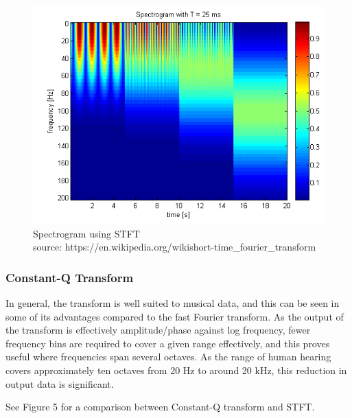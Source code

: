 \begin{figure}[h]
	\caption[Spectrogram using Short-Term Fourier Transform]{ Spectrogram using STFT \\
	source: https://en.wikipedia.org/wiki\/short-time\_fourier\_transform }
	\centering
	\includegraphics[width=1\textwidth, height=\textheight, keepaspectratio]{"resources/STFT_spectrogram"}
\end{figure}


\subsubsection{Constant-Q Transform}
In general, the transform is well suited to musical data, and this can be seen in some of its advantages compared to the fast Fourier transform. As the output of the transform is effectively amplitude/phase against log frequency, fewer frequency bins are required to cover a given range effectively, and this proves useful where frequencies span several octaves. As the range of human hearing covers approximately ten octaves from 20 Hz to around 20 kHz, this reduction in output data is significant. \cite{constant_q} \par
 See Figure 5 for a comparison between Constant-Q transform and STFT.


